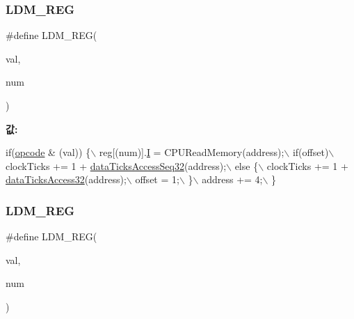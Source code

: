 \mbox{\label{arm-new_8h_a8670776045bbd8e8ee77d691a10b1068}} 
\subsubsection{\texorpdfstring{L\+D\+M\+\_\+\+R\+EG}{LDM\_REG}\hspace{0.1cm}{\footnotesize\ttfamily [1/2]}}
{\footnotesize\ttfamily \#define L\+D\+M\+\_\+\+R\+EG(\begin{DoxyParamCaption}\item[{}]{val,  }\item[{}]{num }\end{DoxyParamCaption})}

{\bfseries 값\+:}
\begin{DoxyCode}
\textcolor{keywordflow}{if}(\mbox{\hyperlink{arm-new_8h_a4fc220098f4b9d0e039a28274d05c198}{opcode}} & (val)) \{\(\backslash\)
    reg[(num)].\mbox{\hyperlink{arm-new_8h_a782b7c7c9a56a2031f6270eac7f000d6}{I}} = CPUReadMemory(address);\(\backslash\)
    if(offset)\(\backslash\)
      clockTicks += 1 + \mbox{\hyperlink{_g_b_a_8cpp_a7f6f2734b76f7d8031fc2ffc5673aa74}{dataTicksAccessSeq32}}(address);\(\backslash\)
    else \{\(\backslash\)
      clockTicks += 1 + \mbox{\hyperlink{_g_b_a_8cpp_ac863611762e3e5f63cd5babe38b2fcc7}{dataTicksAccess32}}(address);\(\backslash\)
      offset = 1;\(\backslash\)
    \}\(\backslash\)
    address += 4;\(\backslash\)
  \}
\end{DoxyCode}
\mbox{\label{_g_b_a_8cpp_a8670776045bbd8e8ee77d691a10b1068}} 
\subsubsection{\texorpdfstring{L\+D\+M\+\_\+\+R\+EG}{LDM\_REG}\hspace{0.1cm}{\footnotesize\ttfamily [2/2]}}
{\footnotesize\ttfamily \#define L\+D\+M\+\_\+\+R\+EG(\begin{DoxyParamCaption}\item[{}]{val,  }\item[{}]{num }\end{DoxyParamCaption})}

